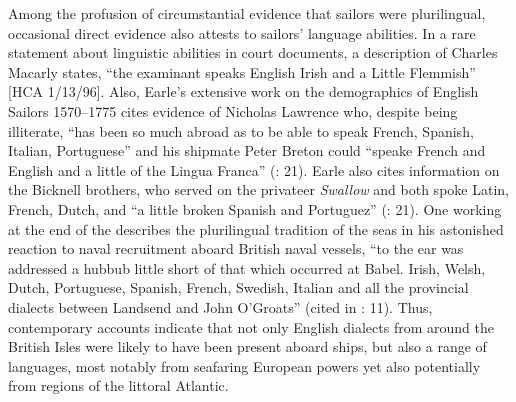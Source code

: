 Among the profusion of circumstantial evidence that sailors were plurilingual, occasional direct evidence also attests to sailors’ language abilities. In a rare statement about linguistic abilities in court documents, a description of Charles Macarly states, “the examinant speaks English Irish and a Little Flemmish” [HCA 1/13/96]. Also, Earle’s extensive work on the demographics of English  Sailors 1570–1775 cites evidence of Nicholas Lawrence who, despite being illiterate, “has been so much abroad as to be able to speak French, Spanish, Italian, Portuguese” and his shipmate Peter Breton could “speake French and English and a little of the Lingua Franca” (\citeyear*{Earle1998}: 21). Earle also cites information on the Bicknell brothers, who served on the privateer \textit{Swallow} and both spoke Latin, French, Dutch, and “a little broken Spanish and Portuguez” (\citeyear*{Earle1998}: 21). One  working at the end of the  describes the plurilingual tradition of the seas in his astonished reaction to naval recruitment aboard British naval vessels, “to the ear was addressed a hubbub little short of that which occurred at Babel. Irish, Welsh, Dutch, Portuguese, Spanish, French, Swedish, Italian and all the provincial dialects between Landsend and John O’Groats” (cited in \citealt{AdkinsAdkins2008}: 11). Thus, contemporary accounts indicate that not only English dialects from around the British Isles were likely to have been present aboard ships, but also a range of languages, most notably from seafaring European powers yet also potentially from regions of the littoral Atlantic. 

